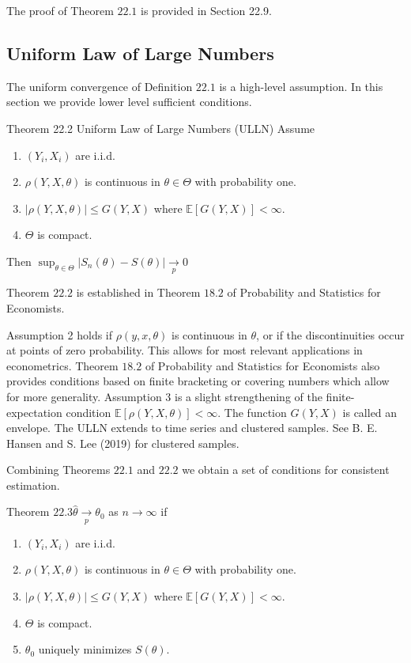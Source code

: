 \documentclass[10pt]{article}
\begin{document}
The proof of Theorem $22.1$ is provided in Section 22.9.

\subsection{Uniform Law of Large Numbers}
The uniform convergence of Definition $22.1$ is a high-level assumption. In this section we provide lower level sufficient conditions.

Theorem 22.2 Uniform Law of Large Numbers (ULLN) Assume

\begin{enumerate}
  \item $\left(Y_{i}, X_{i}\right)$ are i.i.d.

  \item $\rho(Y, X, \theta)$ is continuous in $\theta \in \Theta$ with probability one.

  \item $|\rho(Y, X, \theta)| \leq G(Y, X)$ where $\mathbb{E}[G(Y, X)]<\infty$.

  \item $\Theta$ is compact.

\end{enumerate}
Then $\sup _{\theta \in \Theta}\left|S_{n}(\theta)-S(\theta)\right| \underset{p}{\longrightarrow} 0$

Theorem $22.2$ is established in Theorem $18.2$ of Probability and Statistics for Economists.

Assumption 2 holds if $\rho(y, x, \theta)$ is continuous in $\theta$, or if the discontinuities occur at points of zero probability. This allows for most relevant applications in econometrics. Theorem $18.2$ of Probability and Statistics for Economists also provides conditions based on finite bracketing or covering numbers which allow for more generality. Assumption 3 is a slight strengthening of the finite-expectation condition $\mathbb{E}[\rho(Y, X, \theta)]<\infty$. The function $G(Y, X)$ is called an envelope. The ULLN extends to time series and clustered samples. See B. E. Hansen and S. Lee (2019) for clustered samples.

Combining Theorems $22.1$ and $22.2$ we obtain a set of conditions for consistent estimation.

Theorem $22.3 \hat{\theta} \underset{p}{\longrightarrow} \theta_{0}$ as $n \rightarrow \infty$ if

\begin{enumerate}
  \item $\left(Y_{i}, X_{i}\right)$ are i.i.d.

  \item $\rho(Y, X, \theta)$ is continuous in $\theta \in \Theta$ with probability one.

  \item $|\rho(Y, X, \theta)| \leq G(Y, X)$ where $\mathbb{E}[G(Y, X)]<\infty$.

  \item $\Theta$ is compact.

  \item $\theta_{0}$ uniquely minimizes $S(\theta)$.

\end{enumerate}
\end{document}
